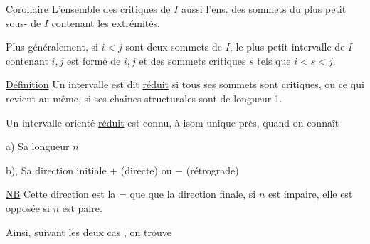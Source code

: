 
\uline{Corollaire} L'ensemble des  critiques de $I$   aussi l'ens. des sommets du  plus petit sous-  de $I$ contenant les extrémités.

Plus généralement, si $i<j$ sont deux sommets de $I$, le plus petit   intervalle de $I$ contenant $i,j$ est formé de $i,j$ et des sommets critiques $s$ tels que $i<s<j$.

\uline{Définition} Un intervalle est dit \uline{réduit}  si tous ses sommets sont critiques, ou ce qui revient au même, si ses chaînes structurales sont de longueur 1.

Un intervalle orienté \uline{réduit} est connu, à isom unique près, quand on connaît

a) Sa longueur $n$

b), Sa direction initiale $+$ (directe) ou $-$ (rétrograde)

\uline{NB} Cette direction est la $\mathord{=}$ que que la direction finale,  si $n$ est impaire, elle est opposée si $n$ est paire.

Ainsi, suivant les deux cas , on trouve



